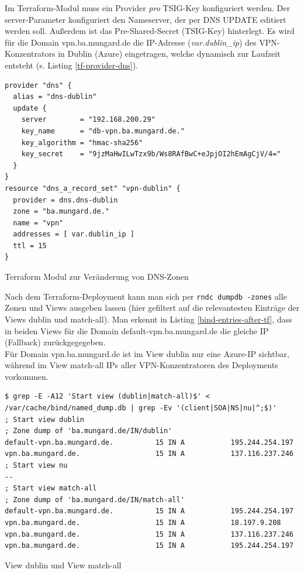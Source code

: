 Im Terraform-Modul muss ein Provider \textit{pro} \gls{TSIG}-Key konfiguriert werden. Der server-Parameter konfiguriert den Nameserver, der per \gls{DNS} UPDATE editiert werden soll. Außerdem ist das Pre-Shared-Secret (\gls{TSIG}-Key) hinterlegt. Es wird für die Domain vpn.ba.mungard.de die IP-Adresse (\textit{var.dublin\_ip}) des \gls{VPN-Konzentrator}s in Dublin (Azure) eingetragen, welche dynamisch zur Laufzeit entsteht (s. Listing \ref{tf-provider-dns}).
\begin{listing}[h]
\begin{verbatim}
provider "dns" {
  alias = "dns-dublin"
  update {
    server        = "192.168.200.29"
    key_name      = "db-vpn.ba.mungard.de."
    key_algorithm = "hmac-sha256"
    key_secret    = "9jzMaHwILwTzx9b/Ws8RAfBwC+eJpjOI2hEmAgCjV/4="
  }
}
resource "dns_a_record_set" "vpn-dublin" {
  provider = dns.dns-dublin
  zone = "ba.mungard.de."
  name = "vpn"
  addresses = [ var.dublin_ip ]
  ttl = 15
}
\end{verbatim}
\caption{Terraform Modul zur Veränderung von DNS-Zonen}
\label{tf-provider-dns}
\end{listing}\FloatBarrier
Nach dem Terraform-\gls{Deployment} kann man sich per \texttt{rndc dumpdb -zones} alle \gls{Zone}n und \gls{View}s ausgeben lassen (hier gefiltert auf die relevantesten Einträge der \gls{View}s \glqq dublin\grqq{} und \glqq match-all\grqq{}). Man erkennt in Listing \ref{bind-entries-after-tf}, dass in beiden \gls{View}s für die Domain default-vpn.ba.mungard.de die gleiche IP (\glqq \gls{Fallback}\grqq{}) zurückgegegeben.\\
Für Domain vpn.ba.mungard.de ist im \gls{View} \glqq dublin\grqq{} nur eine Azure-IP sichtbar, während im \gls{View} \glqq match-all\grqq{} IPs aller \gls{VPN-Konzentrator}en des \gls{Deployment}s vorkommen.
\begin{listing}[h]
\begin{verbatim}
$ grep -E -A12 'Start view (dublin|match-all)$' < /var/cache/bind/named_dump.db | grep -Ev '(client|SOA|NS|nu|^;$)'
; Start view dublin
; Zone dump of 'ba.mungard.de/IN/dublin'
default-vpn.ba.mungard.de.          15 IN A           195.244.254.197
vpn.ba.mungard.de.                  15 IN A           137.116.237.246
; Start view nu
--
; Start view match-all
; Zone dump of 'ba.mungard.de/IN/match-all'
default-vpn.ba.mungard.de.          15 IN A           195.244.254.197
vpn.ba.mungard.de.                  15 IN A           18.197.9.208
vpn.ba.mungard.de.                  15 IN A           137.116.237.246
vpn.ba.mungard.de.                  15 IN A           195.244.254.197

\end{verbatim}
\caption{View \glqq dublin\grqq{} und View \glqq match-all\grqq{}}
\label{bind-entries-after-tf}
\end{listing}\FloatBarrier

